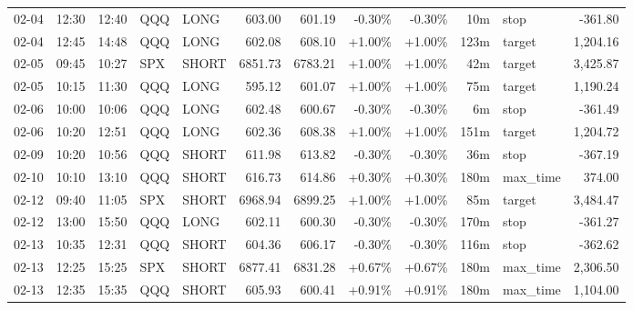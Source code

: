 \documentclass[11pt,a4paper,twoside]{article}
\begin{document}
\begin{center}
\begin{longtable}{>{\color{txtmain}}l l l l l r r r r r >{\color{txtmain}}l r}
02-04 & 12:30 & 12:40 & QQQ & LONG & 603.00 & 601.19 & \textcolor{lossred}{-0.30\%} & \textcolor{lossred}{-0.30\%} & 10m & stop & \textcolor{lossred}{-361.80} \\
02-04 & 12:45 & 14:48 & QQQ & LONG & 602.08 & 608.10 & \textcolor{wingreen}{+1.00\%} & \textcolor{wingreen}{+1.00\%} & 123m & target & \textcolor{wingreen}{1,204.16} \\
02-05 & 09:45 & 10:27 & SPX & SHORT & 6851.73 & 6783.21 & \textcolor{wingreen}{+1.00\%} & \textcolor{wingreen}{+1.00\%} & 42m & target & \textcolor{wingreen}{3,425.87} \\
02-05 & 10:15 & 11:30 & QQQ & LONG & 595.12 & 601.07 & \textcolor{wingreen}{+1.00\%} & \textcolor{wingreen}{+1.00\%} & 75m & target & \textcolor{wingreen}{1,190.24} \\
02-06 & 10:00 & 10:06 & QQQ & LONG & 602.48 & 600.67 & \textcolor{lossred}{-0.30\%} & \textcolor{lossred}{-0.30\%} & 6m & stop & \textcolor{lossred}{-361.49} \\
02-06 & 10:20 & 12:51 & QQQ & LONG & 602.36 & 608.38 & \textcolor{wingreen}{+1.00\%} & \textcolor{wingreen}{+1.00\%} & 151m & target & \textcolor{wingreen}{1,204.72} \\
02-09 & 10:20 & 10:56 & QQQ & SHORT & 611.98 & 613.82 & \textcolor{lossred}{-0.30\%} & \textcolor{lossred}{-0.30\%} & 36m & stop & \textcolor{lossred}{-367.19} \\
02-10 & 10:10 & 13:10 & QQQ & SHORT & 616.73 & 614.86 & \textcolor{wingreen}{+0.30\%} & \textcolor{wingreen}{+0.30\%} & 180m & max\_time & \textcolor{wingreen}{374.00} \\
02-12 & 09:40 & 11:05 & SPX & SHORT & 6968.94 & 6899.25 & \textcolor{wingreen}{+1.00\%} & \textcolor{wingreen}{+1.00\%} & 85m & target & \textcolor{wingreen}{3,484.47} \\
02-12 & 13:00 & 15:50 & QQQ & LONG & 602.11 & 600.30 & \textcolor{lossred}{-0.30\%} & \textcolor{lossred}{-0.30\%} & 170m & stop & \textcolor{lossred}{-361.27} \\
02-13 & 10:35 & 12:31 & QQQ & SHORT & 604.36 & 606.17 & \textcolor{lossred}{-0.30\%} & \textcolor{lossred}{-0.30\%} & 116m & stop & \textcolor{lossred}{-362.62} \\
02-13 & 12:25 & 15:25 & SPX & SHORT & 6877.41 & 6831.28 & \textcolor{wingreen}{+0.67\%} & \textcolor{wingreen}{+0.67\%} & 180m & max\_time & \textcolor{wingreen}{2,306.50} \\
02-13 & 12:35 & 15:35 & QQQ & SHORT & 605.93 & 600.41 & \textcolor{wingreen}{+0.91\%} & \textcolor{wingreen}{+0.91\%} & 180m & max\_time & \textcolor{wingreen}{1,104.00} \\

\end{longtable}
\end{center}
\end{document}
